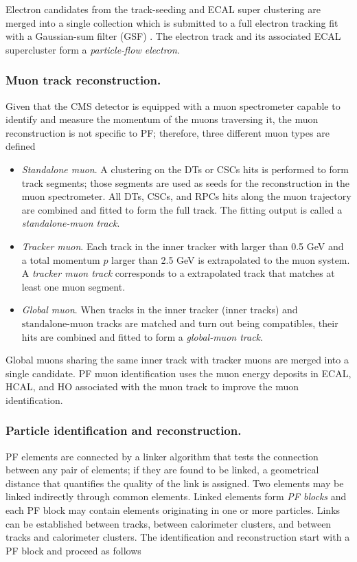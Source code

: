 Electron candidates from the track-seeding and ECAL super clustering are merged into a single collection which is submitted to a full electron tracking fit with a Gaussian-sum filter (GSF) \cite{gsf}. The electron track and its associated ECAL supercluster form a \textit{particle-flow electron}.

\subsubsection*{Muon track reconstruction.}

Given that the CMS detector is equipped with a muon spectrometer capable to identify and measure the momentum of the muons traversing it, the muon reconstruction is not specific to PF; therefore, three different muon types are defined

\begin{itemize}
\item \textit{Standalone muon}. A clustering on the DTs or CSCs hits is performed to form track segments; those segments are used as seeds for the reconstruction in the muon spectrometer. All DTs, CSCs, and RPCs hits along the muon trajectory are combined and fitted to form the full track. The fitting output is called a \textit{standalone-muon track}.
\item \textit{Tracker muon}. Each track in the inner tracker with \pt larger than 0.5 GeV and a total momentum $p$ larger than 2.5 GeV is extrapolated to the muon system. A \textit{tracker muon track} corresponds to a extrapolated track that matches at least one muon segment.
\item \textit{Global muon}. When tracks in the inner tracker (inner tracks) and ${\textrm{standalone-muon}}$ tracks are matched and turn out being compatibles, their hits are combined and fitted to form a \textit{global-muon track}. 
\end{itemize}

Global muons sharing the same inner track with tracker muons are merged into a single candidate. PF muon identification uses the muon energy deposits in ECAL, HCAL, and HO associated with the muon track to improve the muon identification.

\subsubsection*{Particle identification and reconstruction.} \label{subsubsec:part_id_reco}

PF elements are connected by a linker algorithm that tests the connection between any pair of elements; if they are found to be linked, a geometrical distance that quantifies the quality of the link is assigned. Two elements may be linked indirectly through common elements. Linked elements form \textit{PF blocks} and each PF block may contain elements originating in one or more particles. Links can be established between tracks, between calorimeter clusters, and between tracks and calorimeter clusters. The identification and reconstruction start with a PF block and proceed as follows     


